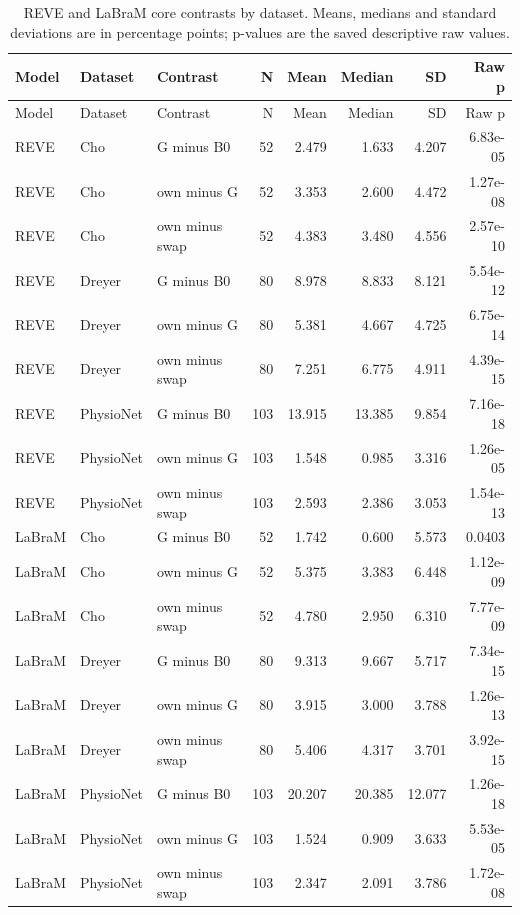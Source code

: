 \begin{longtable}{llp{1.5in}rrrrr}
\caption{REVE and LaBraM core contrasts by dataset. Means, medians and standard deviations are in percentage points; p-values are the saved descriptive raw values.}\label{tab:cross_original_comparisons}\\
\toprule
Model & Dataset & Contrast & N & Mean & Median & SD & Raw p \\
\midrule
\endfirsthead
\toprule
Model & Dataset & Contrast & N & Mean & Median & SD & Raw p \\
\midrule
\endhead
REVE & Cho & G minus B0 & 52 & 2.479 & 1.633 & 4.207 & 6.83e-05 \\
REVE & Cho & own minus G & 52 & 3.353 & 2.600 & 4.472 & 1.27e-08 \\
REVE & Cho & own minus swap & 52 & 4.383 & 3.480 & 4.556 & 2.57e-10 \\
REVE & Dreyer & G minus B0 & 80 & 8.978 & 8.833 & 8.121 & 5.54e-12 \\
REVE & Dreyer & own minus G & 80 & 5.381 & 4.667 & 4.725 & 6.75e-14 \\
REVE & Dreyer & own minus swap & 80 & 7.251 & 6.775 & 4.911 & 4.39e-15 \\
REVE & PhysioNet & G minus B0 & 103 & 13.915 & 13.385 & 9.854 & 7.16e-18 \\
REVE & PhysioNet & own minus G & 103 & 1.548 & 0.985 & 3.316 & 1.26e-05 \\
REVE & PhysioNet & own minus swap & 103 & 2.593 & 2.386 & 3.053 & 1.54e-13 \\
LaBraM & Cho & G minus B0 & 52 & 1.742 & 0.600 & 5.573 & 0.0403 \\
LaBraM & Cho & own minus G & 52 & 5.375 & 3.383 & 6.448 & 1.12e-09 \\
LaBraM & Cho & own minus swap & 52 & 4.780 & 2.950 & 6.310 & 7.77e-09 \\
LaBraM & Dreyer & G minus B0 & 80 & 9.313 & 9.667 & 5.717 & 7.34e-15 \\
LaBraM & Dreyer & own minus G & 80 & 3.915 & 3.000 & 3.788 & 1.26e-13 \\
LaBraM & Dreyer & own minus swap & 80 & 5.406 & 4.317 & 3.701 & 3.92e-15 \\
LaBraM & PhysioNet & G minus B0 & 103 & 20.207 & 20.385 & 12.077 & 1.26e-18 \\
LaBraM & PhysioNet & own minus G & 103 & 1.524 & 0.909 & 3.633 & 5.53e-05 \\
LaBraM & PhysioNet & own minus swap & 103 & 2.347 & 2.091 & 3.786 & 1.72e-08 \\
\bottomrule
\end{longtable}

